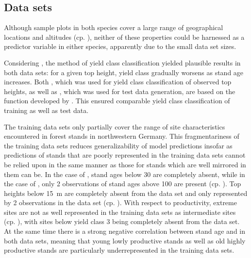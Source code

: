 \subsection{Data sets}

Although sample plots in both species cover a large range of geographical locations and altitudes (cp. ), neither of these properties could be harnessed as a predictor variable in either species, apparently due to the small data set sizes.

Considering , the method of yield class classification yielded plausible results in both data sets:  for a given top height, yield class gradually worsens as stand age increases.  Both , which was used for yield class classification of observed top heights, as well as , which was used for test data generation, are based on the function developed by \textcite{Nagel1999}.  This ensured comparable yield class classification of training as well as test data.

The training data sets only partially cover the range of site characteristics encountered in forest stands in northwestern Germany.
This fragmentariness of the training data sets reduces generalizability of model predictions insofar as predictions of stands that are poorly represented in the training data sets cannot be relied upon in the same manner as those for stands which are well mirrored in them can be.
In the case of \Beech{}, stand ages below \SI{30}{\year} are completely absent, while in the case of \Spruce{}, only \num{2} observations of stand ages above \SI{100}{\year} are present (cp. ).
Top heights below \SI{15}{\meter} are completely absent from the \Beech{} data set and only represented by \num{2} observations in the \Spruce{} data set (cp. ).
With respect to productivity, extreme sites are not as well represented in the training data sets as intermediate sites (cp. ), with sites below yield class \num{3} being completely absent from the \Beech{} data set.  At the same time there is a strong negative correlation between stand age and \ProductivityIndexText{} in both data sets, meaning that young lowly productive stands as well as old highly productive stands are particularly underrepresented in the training data sets.

